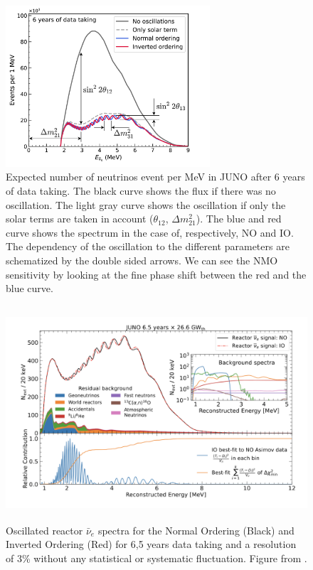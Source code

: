 \documentclass[../main.tex]{subfiles}
\begin{document}
\begin{figure}[ht]
\centering
  \centering
  \includegraphics[height=6cm]{images/juno/Spectrum-OscillationsOnly_dm2_31.png}
  \caption{Expected number of neutrinos event per MeV in JUNO after 6 years of data taking. The black curve shows the flux if there was no oscillation. The light gray curve shows the oscillation if only the solar terms are taken in account ($\theta_{12}$, $\Delta m_{21}^2$). The blue and red curve shows the spectrum in the case of, respectively, NO and IO. The dependency of the oscillation to the different parameters are schematized by the double sided arrows. We can see the NMO sensitivity by looking at the fine phase shift between the red and the blue curve.}
  \label{fig:joint_fit:juno-spectrum-oscillation}
\end{figure}
\begin{figure}[ht]
  \centering
  \includegraphics[height=8cm]{images/joint_fit/mass_ordering.png}
  \caption{Oscillated reactor $\bar{\nu}_e$ spectra for the Normal Ordering (Black) and Inverted Ordering (Red) for 6,5 years data taking and a resolution of 3\% without any statistical or systematic fluctuation. Figure from \cite{abusleme_potential_2024}.}
  \label{fig:joint_fit:juno-ordering}
\end{figure}
\end{document}
